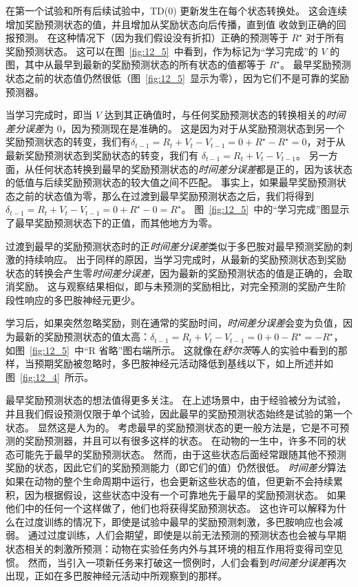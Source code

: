 在第一个试验和所有后续试验中，TD(0) 更新发生在每个状态转换处。
这会连续增加奖励预测状态的值，并且增加从奖励状态向后传播，直到值 收敛到正确的回报预测。
在这种情况下（因为我们假设没有折扣）正确的预测等于 $R^{\star}$ 对于所有奖励预测状态。
这可以在图~\ref{fig:12_5}~中看到，作为标记为“学习完成”的 $V$ 的图，其中从最早到最新的奖励预测状态的所有状态的值都等于 $R^\star$。
最早奖励预测状态之前的状态值仍然很低（图~\ref{fig:12_5}~显示为零），因为它们不是可靠的奖励预测器。


当学习完成时，即当 $V$ 达到其正确值时，与任何奖励预测状态的转换相关的\textit{时间差分误差}为 0，因为预测现在是准确的。
这是因为对于从奖励预测状态到另一个奖励预测状态的转变，我们有$\delta_{t-1} = R_t + V_t - V_{t-1} = 0 + R^{\star} - R^{\star} = 0$，对于从最新奖励预测状态到奖励状态的转变，我们有 $\delta_{t-1} = R_t + V_t - V_{t-1}$。
另一方面，从任何状态转换到最早的奖励预测状态的\textit{时间差分误差}都是正的，因为该状态的低值与后续奖励预测状态的较大值之间不匹配。
事实上，如果最早奖励预测状态之前的状态值为零，那么在过渡到最早奖励预测状态之后，我们将得到 $\delta_{t-1} = R_t + V_t - V_{t-1} = 0 + R^{\star} - 0 = R^{\star}$。 
图~\ref{fig:12_5}~中的“学习完成”图显示了最早奖励预测状态下的正值，而其他地方为零。


过渡到最早的奖励预测状态时的正\textit{时间差分误差}类似于多巴胺对最早预测奖励的刺激的持续响应。
出于同样的原因，当学习完成时，从最新的奖励预测状态到奖励状态的转换会产生零\textit{时间差分误差}，因为最新的奖励预测状态的值是正确的，会取消奖励。
这与观察结果相似，即与未预测的奖励相比，对完全预测的奖励产生阶段性响应的多巴胺神经元更少。


学习后，如果突然忽略奖励，则在通常的奖励时间，\textit{时间差分误差}会变为负值，因为最新的奖励预测状态的值太高：$\delta_{t-1} = R_t + V_t - V_{t-1} = 0 + 0 - R^{\star} = -R^{\star}$，如图~\ref{fig:12_5}~中“R 省略”图右端所示。
这就像在\textit{舒尔茨}等人的实验中看到的那样\cite{schultz1993responses}，当预期奖励被忽略时，多巴胺神经元活动降低到基线以下，如上所述并如图~\ref{fig:12_4}~所示。


最早奖励预测状态的想法值得更多关注。
在上述场景中，由于经验被分为试验，并且我们假设预测仅限于单个试验，因此最早的奖励预测状态始终是试验的第一个状态。
显然这是人为的。
考虑最早的奖励预测状态的更一般方法是，它是不可预测的奖励预测器，并且可以有很多这样的状态。
在动物的一生中，许多不同的状态可能先于最早的奖励预测状态。
然而，由于这些状态后面经常跟随其他不预测奖励的状态，因此它们的奖励预测能力（即它们的值）仍然很低。
\textit{时间差分}算法如果在动物的整个生命周期中运行，也会更新这些状态的值，但更新不会持续累积，因为根据假设，这些状态中没有一个可靠地先于最早的奖励预测状态。
如果他们中的任何一个这样做了，他们也将获得奖励预测状态。
这也许可以解释为什么在过度训练的情况下，即使是试验中最早的奖励预测刺激，多巴胺响应也会减弱。
通过过度训练，人们会期望，即使是以前无法预测的预测状态也会被与早期状态相关的刺激所预测：动物在实验任务内外与其环境的相互作用将变得司空见惯。
然而，当引入一项新任务来打破这一惯例时，人们会看到\textit{时间差分误差}再次出现，正如在多巴胺神经元活动中所观察到的那样。



